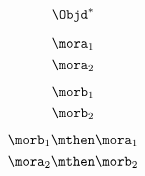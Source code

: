 {\begin{forslides}
        \begin{equation}
            \label{eq:hom-W-op}
            \Objd^\ast
        \end{equation}

        \begin{equation}
            \label{eq:f1}
            \mora_1
        \end{equation}
        \begin{equation}
            \label{eq:f2}
            \mora_2
        \end{equation}

        \begin{equation}
            \label{eq:g1}
            \morb_1
        \end{equation}
        \begin{equation}
            \label{eq:g2}
            \morb_2
        \end{equation}


        \begin{equation}
            \label{eq:g1f1}
            \morb_1\mthen \mora_1
        \end{equation}
        \begin{equation}
            \label{eq:f2g2}
            \mora_2\mthen \morb_2
        \end{equation}
    \end{forslides}
}
